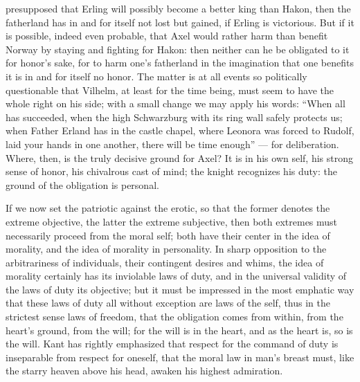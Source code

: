 \documentclass[12pt,a4paper,openany]{book}
\newcommand{\opage}[1]{\marginnote{\footnotesize\textit{[#1]}}}
\begin{document}
presupposed that Erling will possibly become a better king
than Hakon, then the fatherland has in and for itself
not lost but gained, if Erling is victorious. But if it is possible,
indeed even probable, that Axel would rather harm than
benefit Norway by staying and fighting for Hakon: then
neither can he be obligated to it for honor's
sake, for to harm one's fatherland in the imagination that
one benefits it is in and for itself no honor. The matter is
at all events so politically questionable that Vilhelm, at least
for the time being, must seem to have the whole right on his
side; with a small change we may apply his words:
``When all has succeeded, when the high Schwarzburg
with its ring wall safely protects us; when Father Erland has in
the castle chapel, where Leonora was forced to Rudolf, laid
your hands in one another, there will be time enough'' --- for
deliberation. Where, then, is the truly decisive ground for Axel?
It is in his own self, his strong sense of honor,
his chivalrous cast of mind; the knight recognizes
his duty: the ground of the obligation is personal.

If we now set the patriotic against the erotic, so that
the former denotes the extreme objective, the latter the extreme
subjective, then both extremes must necessarily proceed from
the moral self; both have their center in the idea of
morality, and the idea of morality in personality.
In sharp opposition to the arbitrariness of individuals, their contingent
desires and whims, the idea of morality certainly has
its inviolable laws of duty, and in the universal validity of the laws of duty
its objective; but it must be impressed in the most emphatic way
that these laws of duty all without
\setcounter{footnote}{0}%
\opage{601}exception are laws of the self, thus in the strictest sense
laws of freedom, that the obligation comes from within, from the heart's
ground, from the will; for the will is in the heart, and as the
heart is, so is the will. Kant has rightly
emphasized that respect for the command of duty is inseparable
from respect for oneself, that the moral law in man's
breast must, like the starry heaven above his head, awaken
his highest admiration.
\end{document}
